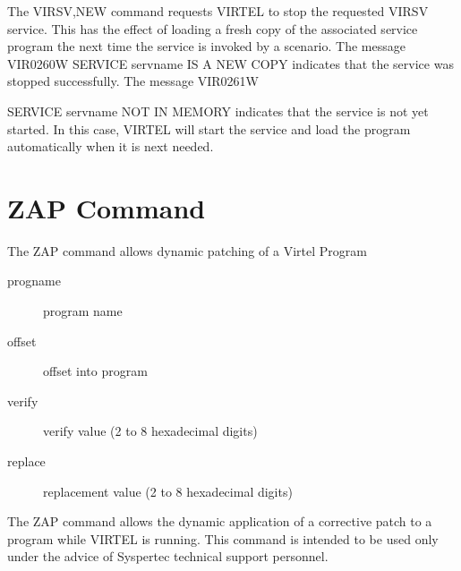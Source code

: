\documentclass[letterpaper,10pt,english]{sphinxmanual}
\begin{document}
The VIRSV,NEW command requests VIRTEL to stop the requested VIRSV service. This has the effect of loading a fresh copy of the associated service program the next time the service is invoked by a scenario. The message VIR0260W SERVICE servname IS A NEW COPY indicates that the service was stopped successfully. The message VIR0261W

SERVICE servname NOT IN MEMORY indicates that the service is not yet started. In this case, VIRTEL will start the service and load the  program automatically when it is next needed.

\ignorespaces 

\section{ZAP Command}
\label{\detokenize{audit_operations_ and_performance:zap-command}}\label{\detokenize{audit_operations_ and_performance:index-34}}
The ZAP command allows dynamic patching of a Virtel Program

\begin{sphinxVerbatim}[commandchars=\\\{\}]
\end{sphinxVerbatim}
\begin{description}
\item[{progname}] \leavevmode
program name

\item[{offset}] \leavevmode
offset into program

\item[{verify}] \leavevmode
verify value (2 to 8 hexadecimal digits)

\item[{replace}] \leavevmode
replacement value (2 to 8 hexadecimal digits)

\end{description}

The ZAP command allows the dynamic application of a corrective patch to a program while VIRTEL is running. This command is intended to be used only under the advice of Syspertec technical support personnel.

\ignorespaces 
\end{document}
